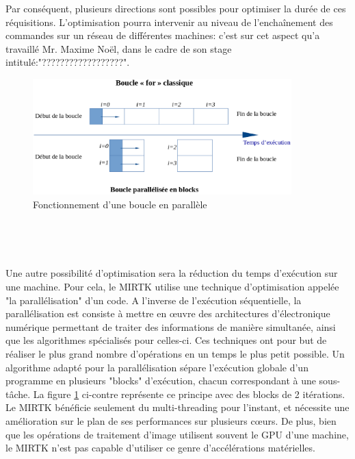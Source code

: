 \documentclass[10pt]{report}
\begin{document}
	Par conséquent, plusieurs directions sont possibles pour optimiser la durée de ces réquisitions. L'optimisation pourra intervenir au niveau de l'enchaînement des commandes sur un réseau de différentes machines: c'est sur cet aspect qu'a travaillé Mr. Maxime Noël, dans le cadre de son stage intitulé:"??????????????????".\\
	\vspace{-0.7cm}
	\newpage
	\begin{figure}
		\includegraphics[width=10cm]{Reports/figures/gfor.eps}	
		\caption{Fonctionnement d'une boucle en parallèle}
		\label{Fonctionnement d'une boucle en parallèle}
	\end{figure}
	
	~\par~\par
	Une autre possibilité d'optimisation sera la réduction du temps d'exécution sur une machine. Pour cela, le MIRTK utilise une technique d'optimisation appelée "la parallélisation" d'un code. 
	A l'inverse de l'exécution séquentielle, la parallélisation est consiste à mettre en œuvre des architectures d'électronique numérique permettant de traiter des informations de manière simultanée, ainsi que les algorithmes spécialisés pour celles-ci. Ces techniques ont pour but de réaliser le plus grand nombre d'opérations en un temps le plus petit possible.
	Un algorithme adapté pour la parallélisation sépare l'exécution globale d'un programme en plusieurs "blocks" d'exécution, chacun correspondant à une sous-tâche. La figure \ref{Fonctionnement d'une boucle en parallèle} ci-contre représente ce principe avec des blocks de 2 itérations.\\

	Le MIRTK bénéficie seulement du multi-threading pour l'instant, et nécessite une amélioration sur le plan de ses performances sur plusieurs cœurs. De plus, bien que les opérations de traitement d'image utilisent souvent le GPU d'une machine, le MIRTK n'est pas capable d'utiliser ce genre d'accélérations matérielles.
	\\
	
\end{document}
